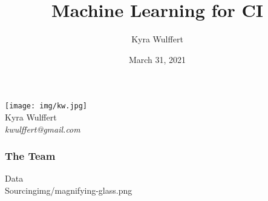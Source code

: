 \documentclass[aspectratio=169,11pt,hyperref={colorlinks=true}]{beamer}
\author[Kyra]{%
\LARGE Kyra Wulffert \\
}
\date{March 31, 2021}
\title{Machine Learning for CI}
\institute[WiDS]{%
Women in Data Science Bristol 2021
}
\begin{document}
\begin{frame}[noframenumbering]
\titlepage{}
\end{frame}

\begin{3columnsframe}
  {
  \begin{centering}
    \texttt{[image: img/kw.jpg]} \\
    Kyra Wulffert \\
    \em{kwulffert@gmail.com} \\
  \end{centering}
  }
  \frametitle{The Team}
\end{3columnsframe}

\begin{sectionpic}
{Data \\Sourcing}{img/magnifying-glass.png}
\end{sectionpic}
\end{document}
